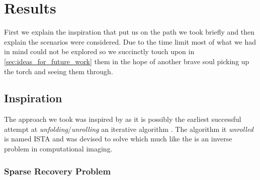 \chapter{Results}

First we explain the inspiration that put us on the path we took briefly and then explain the scenarios were considered. 
Due to the time limit most of what we had in mind could not be explored so we succinctly touch upon in \cref{sec:ideas_for_future_work} them in the hope of another 
brave soul picking up the torch and seeing them through.  

\section{Inspiration}

The approach we took was inspired by \cite{Gregor2010} as it is possibly the earliest successful attempt at \emph{unfolding}/\emph{unrolling} 
an iterative algorithm \cite{Monga2019}. The algorithm it \emph{unrolled} is named \ac{ISTA}\cite{Daubechies2003} and was devised to solve \srp\index{\srp} which much like the \pr\cite{Shechtman2015}\cite{Jaganathan2015}\index{\pr} is an inverse problem\cite{Kirsch2021} in computational imaging\cite{Khare2023}.

\subsection{Sparse Recovery Problem}

